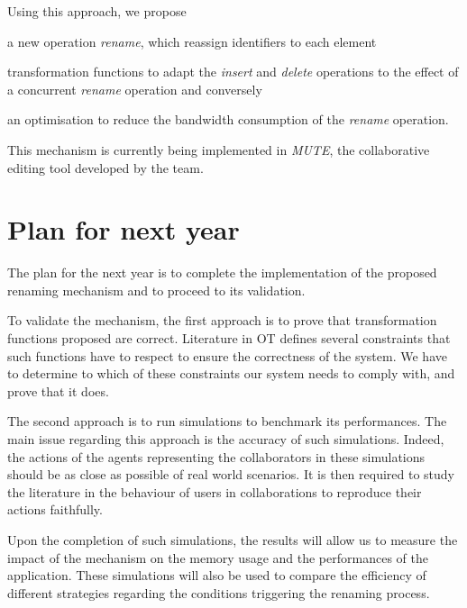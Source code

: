 \documentclass[11pt]{article}
\begin{document}
Using this approach, we propose
\begin{enumerate*}
    \item a new operation \emph{rename}, which reassign identifiers to each element
    \item transformation functions to adapt the \emph{insert} and \emph{delete} operations to the effect of a concurrent \emph{rename} operation and conversely
    \item an optimisation to reduce the bandwidth consumption of the \emph{rename} operation.
\end{enumerate*}

This mechanism is currently being implemented in \emph{MUTE}, the collaborative editing tool developed by the team.

\section*{Plan for next year}

\hspace{1em} The plan for the next year is to complete the implementation of the proposed renaming mechanism
and to proceed to its validation.


To validate the mechanism, the first approach is to prove that transformation functions proposed are correct.
Literature in \ac{OT} defines several constraints that such functions have to respect
to ensure the correctness of the system.
We have to determine to which of these constraints our system needs to comply with, and prove that it does.


The second approach is to run simulations to benchmark its performances.
The main issue regarding this approach is the accuracy of such simulations.
Indeed, the actions of the agents representing the collaborators in these simulations should be as close as possible of real world scenarios.
It is then required to study the literature in the behaviour of users in collaborations to reproduce their actions faithfully.

Upon the completion of such simulations, the results will allow us to measure the impact of the mechanism on the memory usage and the performances of the application.
These simulations will also be used to compare the efficiency of different strategies
regarding the conditions triggering the renaming process.
\end{document}
